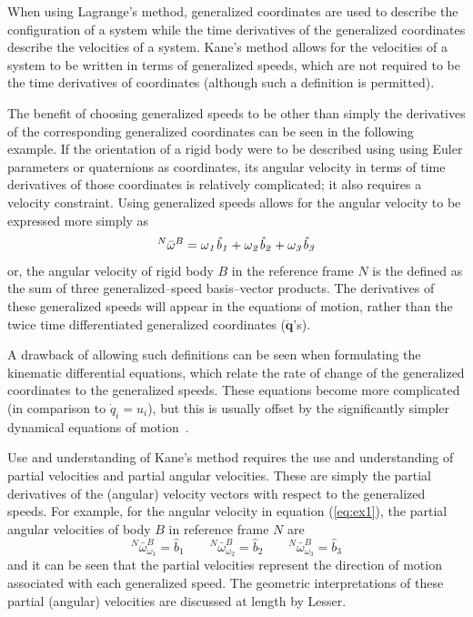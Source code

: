 \documentclass[smallcondensed,final]{svjour3}                     %
\begin{document}
When using Lagrange's method, generalized coordinates are used to describe the
configuration of a system while the time derivatives of the generalized
coordinates describe the velocities of a system.  Kane's method allows for the
velocities of a system to be written in terms of generalized speeds, which are
not required to be the time derivatives of coordinates (although such a
definition is permitted).

The benefit of choosing generalized speeds to be other than simply the
derivatives of the corresponding generalized coordinates can be seen in the
following example. If the orientation of a rigid body were to be described
using using Euler parameters or quaternions as coordinates, its angular
velocity in terms of time derivatives of those coordinates is relatively
complicated; it also requires a velocity constraint. Using generalized speeds
allows for the angular velocity to be expressed more simply as
\begin{align}
\label{eq:ex1}
{^N}\bar{\omega}^B = \it{\omega}_1 \hat{b}_1 + \it{\omega}_2 \hat{b}_2 +
\it{\omega}_3 \hat{b}_3
\end{align}
or, the angular velocity of rigid body $B$ in the reference frame $N$ is the
defined as the sum of three generalized--speed basis--vector products.
The derivatives of these generalized speeds will appear in the equations
of motion, rather than the twice time differentiated generalized coordinates
($\ddot{\mathbf{q}}$'s).

A drawback of allowing such definitions can be seen when formulating the
kinematic differential equations, which relate the rate of change of the
generalized coordinates to the generalized speeds. These equations become more
complicated (in comparison to $\dot{q}_i = u_i$), but this is usually offset by
the significantly simpler dynamical equations of motion~\cite{Mitiguy1996}.

Use and understanding of Kane's method requires the use and understanding of
partial velocities and partial angular velocities. These are simply the
partial derivatives of the (angular) velocity vectors with respect to the
generalized speeds. For example, for the angular velocity in equation
(\ref{eq:ex1}), the partial angular velocities of body $B$ in reference frame
$N$ are
\[
{^N}\bar{\omega}^B_{\omega_1} = \hat{b}_1 \quad \quad
{^N}\bar{\omega}^B_{\omega_2} = \hat{b}_2 \quad \quad
{^N}\bar{\omega}^B_{\omega_3} = \hat{b}_3
\]
and it can be seen that the partial velocities represent the direction of
motion associated with each generalized speed. The geometric interpretations of
these partial (angular) velocities are discussed at length by
Lesser\cite{Lesser1992}.
\end{document}
